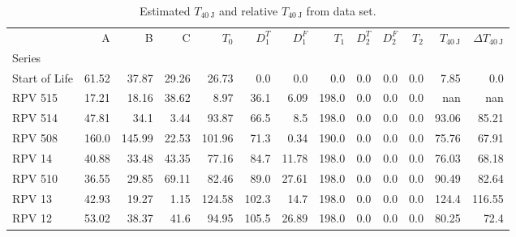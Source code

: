 \documentclass{article}
\begin{document}
    \begin{table}[htb]
    \caption{Estimated $T_{\SI{40}{\joule}}$ and relative $T_{\SI{40}{\joule}}$ from data set.}
    \label{table:estimated_t}
    
    \begin{tabular}{lrrrrrrrrrrrr}
    \toprule
    {} &             A &       B &       C &      $T_0$ &  $D^T_1$ &  $D^F_1$ &  $T_1$ &  $D^T_2$ &  $D^F_2$ &  $T_2$ &    $T_{\SI{40}{\joule}}$ &   $\Delta T_{\SI{40}{\joule}}$ \\
    Series                   &        &        &        &        &                 &              &                            &                 &              &                            &        &        \\
    \midrule
    Start of Life     &  61.52 &  37.87 &  29.26 &  26.73 &             0.0 &          0.0 &                        0.0 &             0.0 &          0.0 &                        0.0 &   7.85 &    0.0 \\
    RPV 515           &  17.21 &  18.16 &  38.62 &   8.97 &            36.1 &         6.09 &                      198.0 &             0.0 &          0.0 &                        0.0 &    nan &    nan \\
    RPV 514           &  47.81 &   34.1 &   3.44 &  93.87 &            66.5 &          8.5 &                      198.0 &             0.0 &          0.0 &                        0.0 &  93.06 &  85.21 \\
    RPV 508           &  160.0 & 145.99 &  22.53 & 101.96 &            71.3 &         0.34 &                      190.0 &             0.0 &          0.0 &                        0.0 &  75.76 &  67.91 \\
    RPV 14            &  40.88 &  33.48 &  43.35 &  77.16 &            84.7 &        11.78 &                      198.0 &             0.0 &          0.0 &                        0.0 &  76.03 &  68.18 \\
    RPV 510           &  36.55 &  29.85 &  69.11 &  82.46 &            89.0 &        27.61 &                      198.0 &             0.0 &          0.0 &                        0.0 &  90.49 &  82.64 \\
    RPV 13            &  42.93 &  19.27 &   1.15 & 124.58 &           102.3 &         14.7 &                      198.0 &             0.0 &          0.0 &                        0.0 &  124.4 & 116.55 \\
    RPV 12            &  53.02 &  38.37 &   41.6 &  94.95 &           105.5 &        26.89 &                      198.0 &             0.0 &          0.0 &                        0.0 &  80.25 &   72.4 \\

\end{tabular}
\end{table}
\end{document}

